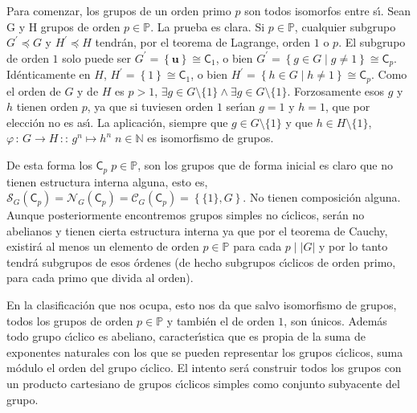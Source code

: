 \documentclass[final,12pt,a4paper,twoside,fleqn]{extbook}
\newcommand{\grclass}[1]{\ensuremath{\mathsf{#1}}}
\newcommand{\cyclicgr}[1]{\ensuremath{{\grclass{C}}_{#1}}}
\newcommand{\neutromult}{\ensuremath{\mathbf{u}}}
\newcommand{\unity}{\ensuremath{\neutromult}}
\theoremstyle{definition}
\theoremstyle{remark}
\begin{document}
Para comenzar, los grupos de un orden primo $p$ son todos isomorfos entre s{\'{\i}}.
Sean G y H grupos de orden $p             \in \mathds{P}$. La prueba es clara.
Si $p             \in \mathds{P}$, cualquier subgrupo
$G^\prime             \preccurlyeq             G$ y $H^\prime             \preccurlyeq             H$
tendr\'an, por el teorema de Lagrange, orden $1$ o $p$. El subgrupo de orden $1$
solo puede ser
$G^\prime = \left\lbrace \unity\right\rbrace                      \cong                      \cyclicgr{1}$,
o bien $G^\prime = \left\lbrace g                     \in G∣g                     \neq                      1
\right\rbrace                      \cong                      \cyclicgr{p}$. Id\'enticamente en
$H$, $H^\prime = \left\lbrace 1\right\rbrace                      \cong                      \mathsf{C}_1$,
o bien $H^\prime = \left\lbrace h                     \in G∣h                     \neq                      1\right\rbrace
                  \cong                      \cyclicgr{p}$. Como el orden de $G$ y de $H$ es $p>1$,
$                     \exists                      g                     \in G\setminus\{1\}                     \wedge
                  \exists                      g                     \in G\setminus\{1\}$. Forzosamente esos $g$ y $h$ tienen orden $p$,
ya que si tuviesen orden $1$ ser{\'{\i}}an $g=1$ y $h=1$, que por elecci\'on no es as{\'{\i}}.
La aplicaci\'on, siempre que $g             \in G\setminus\{1\}$ y que $h             \in H\setminus\{1\}$,
$\varphi \,:\,G             \longrightarrow              H\,::\, g^n             \mapsto h^n \; n             \in \mathds{N}$ es
isomorfismo de grupos.

De esta forma los $\cyclicgr{p}\;p             \in \mathds{P}$, son los grupos que de forma
inicial es claro que no tienen estructura interna alguna, esto es,
$\mathcal{S}_{G}{(\cyclicgr{p})} = \mathcal{N}_{G}{(\cyclicgr{p})} =
\mathcal{C}_{G}{(\cyclicgr{p})} = \left\lbrace{\{1\},G}\right\rbrace$.
No tienen composici\'on alguna. Aunque posteriormente encontremos grupos simples
no c{\'{\i}}clicos, ser\'an no abelianos y tienen cierta estructura interna ya que por el
teorema de Cauchy, existir\'a al menos un elemento de orden $p             \in \mathds{P}$
para cada $p∣\left|G\right|$ y por lo tanto tendr\'a subgrupos de esos \'ordenes
(de hecho subgrupos c{\'{\i}}clicos de orden primo, para cada primo que divida al orden).

En la clasificaci\'on que nos ocupa, esto nos da que salvo isomorfismo de grupos,
todos los grupos de orden $p             \in \mathds{P}$ y tambi\'en el de orden $1$, son
\'unicos. Adem\'as todo grupo c{\'{\i}}clico es abeliano, caracter{\'{\i}}stica
que es propia de la suma de exponentes naturales con los que se pueden representar
los grupos c{\'{\i}}clicos, suma m\'odulo el orden del grupo c{\'{\i}}clico. El intento ser\'a
construir todos los grupos con un producto cartesiano de grupos c{\'{\i}}clicos simples
como conjunto subyacente del grupo.
\end{document}
